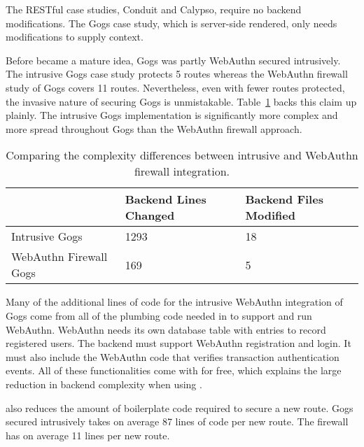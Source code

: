 The RESTful case studies, Conduit and Calypso, require no backend modifications. The Gogs case study, which is server-side rendered, only needs modifications to supply context. 

Before \sys{} became a mature idea, Gogs was partly WebAuthn secured intrusively. The intrusive Gogs case study protects 5 routes whereas the WebAuthn firewall study of Gogs covers 11 routes. Nevertheless, even with fewer routes protected, the invasive nature of securing Gogs is unmistakable. Table~\ref{Table:EvaluationsComplexityDiffIntrusiveFirewall} backs this claim up plainly. The intrusive Gogs implementation is significantly more complex and more spread throughout Gogs than the WebAuthn firewall approach.

\begin{table}[h]
\centering

\begin{tabular}{ m{5cm} m{4.5cm} m{4.5cm}  } 
 \hline
 & Backend Lines Changed & Backend Files Modified \\ 
 \hline \hline

 Intrusive Gogs & 1293 & 18 \\ \hline

 WebAuthn Firewall Gogs & 169 & 5 \\ \hline


\end{tabular}
\caption{Comparing the complexity differences between intrusive and WebAuthn firewall integration.}
\label{Table:EvaluationsComplexityDiffIntrusiveFirewall}
\end{table}

Many of the additional lines of code for the intrusive WebAuthn integration of Gogs come from all of the plumbing code needed in to support and run WebAuthn. WebAuthn needs its own database table with entries to record registered users. The backend must support WebAuthn registration and login. It must also include the WebAuthn code that verifies transaction authentication events. All of these functionalities come with \sys{} for free, which explains the large reduction in backend complexity when using \sys{}.

\sys{} also reduces the amount of boilerplate code required to secure a new route. Gogs secured intrusively takes on average 87 lines of code per new route. The firewall has on average 11 lines per new route.



